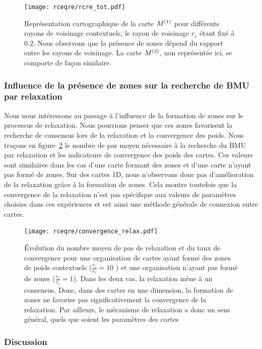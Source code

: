 \documentclass[../main]{subfiles}
\begin{document}
\begin{figure}
	\texttt{[image: rceqre/rcre\_tot.pdf]}
	\caption{Représentation cartographique de la carte $M^{({1})}$ pour différents rayons de voisinage contextuels, le rayon de voisinage $r_e$ étant fixé à $0.2$. 
	Nous observons que la présence de zones dépend du rapport entre les rayons de voisinage.
	La carte $M^{({2})}$, non représentée ici, se comporte de façon similaire.\label{fig:rcre}
	}
\end{figure}

\subsubsection{Influence de la présence de zones sur la recherche de BMU par relaxation}

Nous nous intéressons au passage à l'influence de la formation de zones sur le processus de relaxation.
Nous pourrions penser que ces zones favorisent la recherche de consensus lors de la relaxation et la convergence des poids.
Nous traçons en figure~\ref{fig:conv_rcre} le nombre de pas moyen nécessaire à la recherche du BMU par relaxation et les indicateurs de convergence des poids des cartes.
Ces valeurs sont similaires dans les cas d'une carte formant des zones et d'une carte n'ayant pas formé de zones. Sur des cartes 1D, nous n'observons donc pas d'amélioration de la relaxation grâce à la formation de zones.
Cela montre toutefois que la convergence de la relaxation n'est pas spécifique aux valeurs de paramètres choisies dans ces expériences et est ainsi une méthode générale de connexion entre cartes.

\begin{figure}
	\texttt{[image: rceqre/convergence\_relax.pdf]}
	\caption{\'Evolution du nombre moyen de pas de relaxation et du taux de convergence pour une organisation de cartes ayant formé des zones de poids contextuels ($\frac{r_e}{r_c} = 10$ ) et une organisation n'ayant pas formé de zones ($\frac{r_e}{r_c} = 1$). Dans les deux cas, la relaxation mène à un consensus. 
	Donc, dans des cartes en une dimension, la formation de zones ne favorise pas significativement la convergence de la relaxation. Par ailleurs, le mécanisme de relaxation a donc un sens général, quels que soient les paramètres des cartes \label{fig:conv_rcre}}
\end{figure}

\subsubsection{Discussion}
\end{document}
